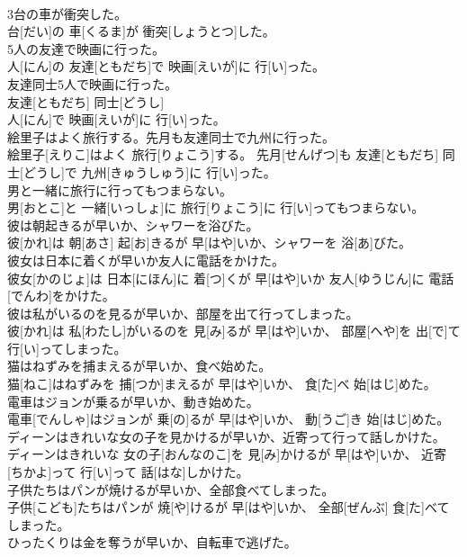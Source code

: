 \documentclass[8pt]{extreport}
\begin{document}
\begin{CJK}{UTF8}{min}
\\	3台の車が衝突した。	
\\	台[だい]の 車[くるま]が 衝突[しょうとつ]した。
\\	5人の友達で映画に行った。	
\\	人[にん]の 友達[ともだち]で 映画[えいが]に 行[い]った。
\\	友達同士5人で映画に行った。	
\\	友達[ともだち] 同士[どうし] 
\\	人[にん]で 映画[えいが]に 行[い]った。
\\	絵里子はよく旅行する。先月も友達同士で九州に行った。	
\\	絵里子[えりこ]はよく 旅行[りょこう]する。 先月[せんげつ]も 友達[ともだち] 同士[どうし]で 九州[きゅうしゅう]に 行[い]った。
\\	男と一緒に旅行に行ってもつまらない。	
\\	男[おとこ]と 一緒[いっしょ]に 旅行[りょこう]に 行[い]ってもつまらない。
\\	彼は朝起きるが早いか、シャワーを浴びた。	
\\	彼[かれ]は 朝[あさ] 起[お]きるが 早[はや]いか、シャワーを 浴[あ]びた。
\\	彼女は日本に着くが早いか友人に電話をかけた。	
\\	彼女[かのじょ]は 日本[にほん]に 着[つ]くが 早[はや]いか 友人[ゆうじん]に 電話[でんわ]をかけた。
\\	彼は私がいるのを見るが早いか、部屋を出て行ってしまった。	
\\	彼[かれ]は 私[わたし]がいるのを 見[み]るが 早[はや]いか、 部屋[へや]を 出[で]て 行[い]ってしまった。
\\	猫はねずみを捕まえるが早いか、食べ始めた。	
\\	猫[ねこ]はねずみを 捕[つか]まえるが 早[はや]いか、 食[た]べ 始[はじ]めた。
\\	電車はジョンが乗るが早いか、動き始めた。	
\\	電車[でんしゃ]はジョンが 乗[の]るが 早[はや]いか、 動[うご]き 始[はじ]めた。
\\	ディーンはきれいな女の子を見かけるが早いか、近寄って行って話しかけた。	
\\	ディーンはきれいな 女の子[おんなのこ]を 見[み]かけるが 早[はや]いか、 近寄[ちかよ]って 行[い]って 話[はな]しかけた。
\\	子供たちはパンが焼けるが早いか、全部食べてしまった。	
\\	子供[こども]たちはパンが 焼[や]けるが 早[はや]いか、 全部[ぜんぶ] 食[た]べてしまった。
\\	ひったくりは金を奪うが早いか、自転車で逃げた。	

\end{CJK}
\end{document}
